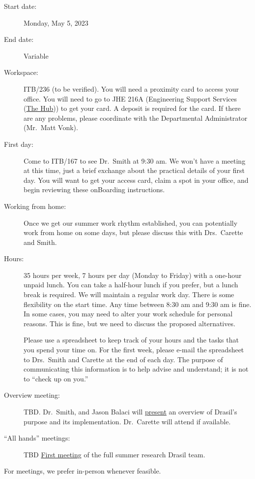 \documentclass[12pt]{article}
\begin{document}
\begin{description}

\item [Start date:] Monday, May 5, 2023

\item [End date:] Variable %

\item [Workspace:] ITB/236 (to be verified). You will need a proximity card to access your
office.  You will need to go to JHE 216A (Engineering Support Services
(\href{https://www.eng.mcmaster.ca/engineering-support-services-hub/} {The
Hub})) to get your card.  A deposit is required for the card.  If there are any
problems, please coordinate with the Departmental Administrator (Mr.\ Matt Vonk).  

\item [First day:] Come to ITB/167 to see Dr.\ Smith at 9:30 am.  We won't have
a meeting at this time, just a brief exchange about the practical details of
your first day.  You will want to get your access card, claim a spot in your office,
and begin reviewing these onBoarding instructions.

\item [Working from home:] Once we get our summer work rhythm established, you
can potentially work from home on some days, but please discuss this with Drs.\
Carette and Smith.

\item [Hours:] 35 hours per week, 7 hours per day (Monday to Friday) with a
one-hour unpaid lunch.  You can take a half-hour lunch if you prefer, but a
lunch break is required. We will maintain a regular work day.  There is some
flexibility on the start time.  Any time between 8:30 am and 9:30 am is fine.
In some cases, you may need to alter your work schedule for personal reasons.
This is fine, but we need to discuss the proposed alternatives.

Please use a spreadsheet to keep track of your hours and the tasks that you
spend your time on.  For the first week, please e-mail the spreadsheet to Drs.\
Smith and Carette at the end of each day.  The purpose of communicating this
information is to help advise and understand; it is not to ``check up on you.''

\item [Overview meeting:] TBD.  Dr.\ Smith, and 
Jason Balaci will
\href{https://github.com/JacquesCarette/Drasil/issues/4041} {present} an
overview of Drasil's purpose and its implementation.  Dr.\ Carette will attend
if available.

\item [``All hands'' meetings:] TBD
\href{https://github.com/JacquesCarette/Drasil/issues/4042} {First meeting} of
the full summer research Drasil team.

\end{description}
For meetings, we prefer in-person whenever feasible.
\end{document}

